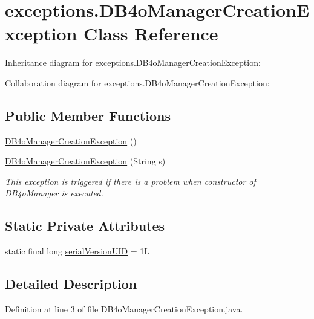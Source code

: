 \hypertarget{classexceptions_1_1DB4oManagerCreationException}{}\section{exceptions.\+D\+B4o\+Manager\+Creation\+Exception Class Reference}
\label{classexceptions_1_1DB4oManagerCreationException}


Inheritance diagram for exceptions.\+D\+B4o\+Manager\+Creation\+Exception\+:


Collaboration diagram for exceptions.\+D\+B4o\+Manager\+Creation\+Exception\+:
\subsection*{Public Member Functions}
\begin{DoxyCompactItemize}
\item 
\mbox{\hyperlink{classexceptions_1_1DB4oManagerCreationException_a5da5879180740606e8a3f1c2f88f01dc}{D\+B4o\+Manager\+Creation\+Exception}} ()
\item 
\mbox{\hyperlink{classexceptions_1_1DB4oManagerCreationException_a45281047a13292cbee85b6f04547adc5}{D\+B4o\+Manager\+Creation\+Exception}} (String s)
\begin{DoxyCompactList}\small\item\em This exception is triggered if there is a problem when constructor of D\+B4o\+Manager is executed. \end{DoxyCompactList}\end{DoxyCompactItemize}
\subsection*{Static Private Attributes}
\begin{DoxyCompactItemize}
\item 
static final long \mbox{\hyperlink{classexceptions_1_1DB4oManagerCreationException_af611b151185c866376c172feb883428a}{serial\+Version\+U\+ID}} = 1L
\end{DoxyCompactItemize}


\subsection{Detailed Description}


Definition at line 3 of file D\+B4o\+Manager\+Creation\+Exception.\+java.



